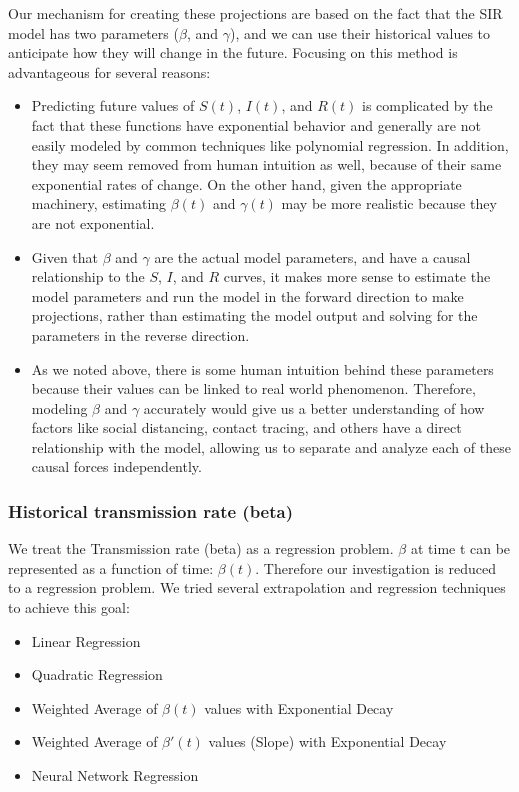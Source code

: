\documentclass[11pt]{article}
\begin{document}
Our mechanism for creating these projections are based on the fact that the SIR model has two parameters ($\beta$, and $\gamma$), and we can use their historical values to anticipate how they will change in the future. Focusing on this method is advantageous for several reasons:
\begin{itemize}
    \item Predicting future values of $S(t)$, $I(t)$, and $R(t)$ is complicated by the fact that these functions have exponential behavior and generally are not easily modeled by common techniques like polynomial regression. In addition, they may seem removed from human intuition as well, because of their same exponential rates of change. On the other hand, given the appropriate machinery, estimating $\beta(t)$ and $\gamma(t)$ may be more realistic because they are not exponential.
    \item Given that $\beta$ and $\gamma$ are the actual model parameters, and have a causal relationship to the $S$, $I$, and $R$ curves, it makes more sense to estimate the model parameters and run the model in the forward direction to make projections, rather than estimating the model output and solving for the parameters in the reverse direction.
    \item As we noted above, there is some human intuition behind these parameters because their values can be linked to real world phenomenon. Therefore, modeling $\beta$ and $\gamma$ accurately would give us a better understanding of how factors like social distancing, contact tracing, and others have a direct relationship with the model, allowing us to separate and analyze each of these causal forces independently.
\end{itemize}

\subsubsection{Historical transmission rate (beta)}
We treat the Transmission rate (beta) as a regression problem. $\beta$ at time t can be represented as a function of time: $\beta(t)$. Therefore our investigation is reduced to a regression problem.  We tried several extrapolation and regression techniques to achieve this goal:
\begin{itemize}
    \item Linear Regression
    \item Quadratic Regression
    \item Weighted Average of $\beta(t)$ values with Exponential Decay
    \item Weighted Average of $\beta'(t)$ values (Slope) with Exponential Decay
    \item Neural Network Regression
\end{itemize}
\end{document}
